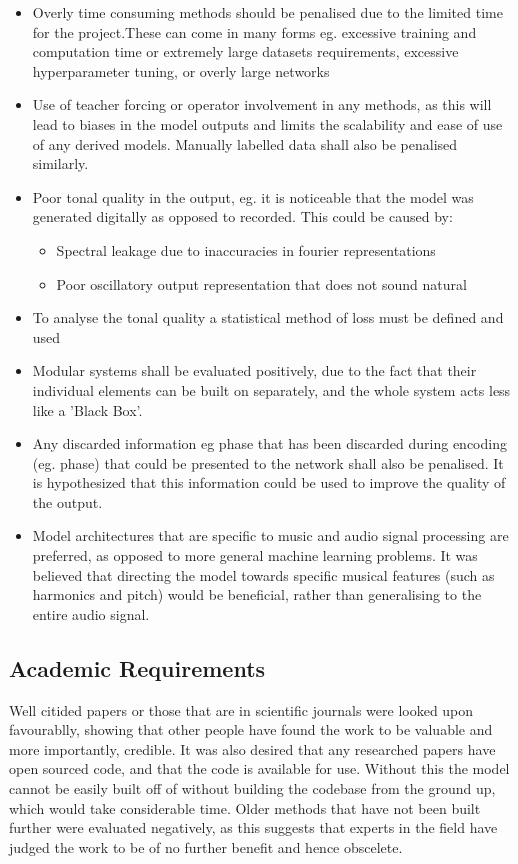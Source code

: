 \begin{itemize}
    \item Overly time consuming methods should be penalised due to the limited time for the project.These can come in many forms eg. excessive training and computation time or extremely large datasets requirements, excessive hyperparameter tuning, or overly large networks
    \item Use of teacher forcing or operator involvement in any methods, as this will lead to biases in the model outputs and limits the scalability and ease of use of any derived models. Manually labelled data shall also be penalised similarly.
    \item Poor tonal quality in the output, eg. it is noticeable that the model was generated digitally as opposed to recorded. This could be caused by:
          \begin{itemize}
              \item Spectral leakage due to inaccuracies in fourier representations
              \item Poor oscillatory output representation that does not sound natural
          \end{itemize}
    \item To analyse the tonal quality a statistical method of loss must be defined and used
    \item Modular systems shall be evaluated positively, due to the fact that their individual elements can be built on separately, and the whole system acts less like a 'Black Box'.
    \item Any discarded information eg phase that has been discarded during encoding (eg. phase) that could be presented to the network shall also be penalised. It is hypothesized that this information could be used to improve the quality of the output.
    \item Model architectures that are specific to music and audio signal processing are preferred, as opposed to more general machine learning problems. It was believed that directing the model towards specific musical features (such as harmonics and pitch) would be beneficial, rather than generalising to the entire audio signal.
\end{itemize}

\subsection{Academic Requirements}

Well citided papers or those that are in scientific journals were looked upon favourablly, showing that other people have found the work to be valuable and more importantly, credible. It was also desired that any researched papers have open sourced code, and that the code is available for use. Without this the model cannot be easily built off of without building the codebase from the ground up, which would take considerable time. Older methods that have not been built further were evaluated negatively, as this suggests that experts in the field have judged the work to be of no further benefit and hence obscelete.

